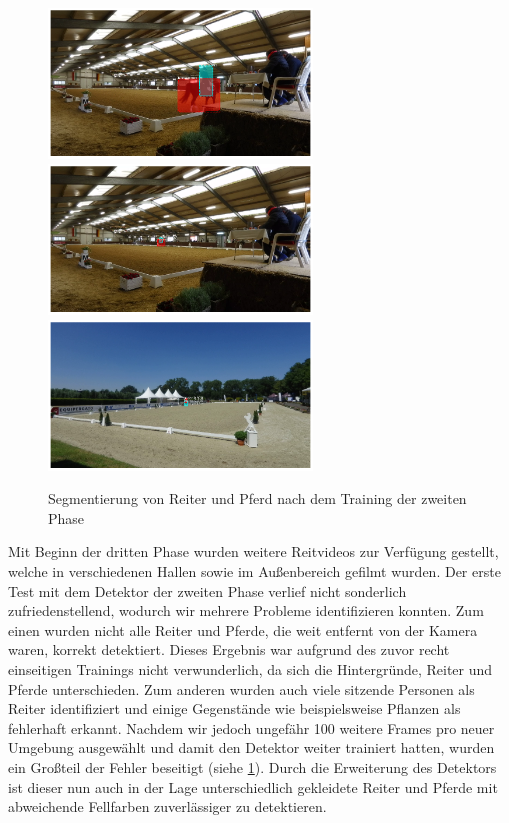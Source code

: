\begin{figure}[b]
\centering
\includegraphics[height=4cm,trim={6cm 0 6cm 0},clip]{./img/IndoorMask6.png}
\includegraphics[height=4cm,trim={6cm 0 6cm 0},clip]{./img/IndoorMask3.png}
\includegraphics[height=4cm,trim={6cm 0 6cm 0},clip]{./img/OutdoorMask2.png}
\caption{Segmentierung von Reiter und Pferd nach dem Training der zweiten Phase}
\label{fig:SegmentierungPhase3}
\end{figure}

Mit Beginn der dritten Phase wurden weitere Reitvideos zur Verfügung gestellt, welche in verschiedenen Hallen sowie im Außenbereich gefilmt wurden. Der erste Test mit dem Detektor der zweiten Phase verlief nicht sonderlich zufriedenstellend, wodurch wir mehrere Probleme identifizieren konnten. Zum einen wurden nicht alle Reiter und Pferde, die weit entfernt von der Kamera waren, korrekt detektiert. Dieses Ergebnis war aufgrund des zuvor recht einseitigen Trainings nicht verwunderlich, da sich die Hintergründe, Reiter und Pferde unterschieden. Zum anderen wurden auch viele sitzende Personen als Reiter identifiziert und einige Gegenstände wie beispielsweise Pflanzen als fehlerhaft erkannt. Nachdem wir jedoch ungefähr 100 weitere Frames pro neuer Umgebung ausgewählt und damit den Detektor weiter trainiert hatten, wurden ein Großteil der Fehler beseitigt (siehe \ref{fig:SegmentierungPhase3}). Durch die Erweiterung des Detektors ist dieser nun auch in der Lage unterschiedlich gekleidete Reiter und Pferde mit abweichende Fellfarben zuverlässiger zu detektieren.



